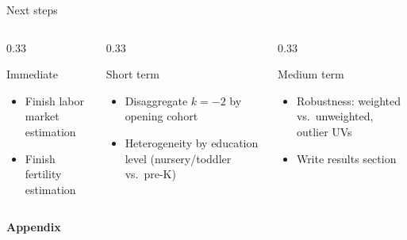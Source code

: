 \documentclass[aspectratio=169,10pt]{beamer}
\begin{document}
\begin{frame}{Next steps}
\begin{columns}[T]
\begin{column}{0.33\textwidth}
\begin{block}{Immediate}
\footnotesize
\begin{itemize}
  \item Finish labor market estimation
  \item Finish fertility estimation
\end{itemize}
\end{block}
\end{column}
\begin{column}{0.33\textwidth}
\begin{block}{Short term}
\footnotesize
\begin{itemize}
  \item Disaggregate $k=-2$ by opening cohort
  \item Heterogeneity by education level (nursery/toddler vs.\ pre-K)
\end{itemize}
\end{block}
\end{column}
\begin{column}{0.33\textwidth}
\begin{block}{Medium term}
\footnotesize
\begin{itemize}
  \item Robustness: weighted vs.\ unweighted, outlier UVs
  \item Write results section
\end{itemize}
\end{block}
\end{column}
\end{columns}
\end{frame}

\appendix
\begin{frame}[plain]
\vspace{60pt}
\begin{center}
{\LARGE\bfseries\color{navy} Appendix}
\end{center}
\end{frame}
\end{document}
